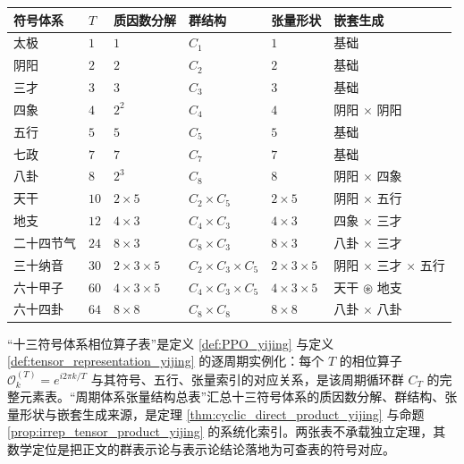 \begin{center}
\begin{tabular}{>{\centering\arraybackslash}p{2.2cm}>{\centering\arraybackslash}p{1cm}>{\centering\arraybackslash}p{2.5cm}>{\centering\arraybackslash}p{3cm}>{\centering\arraybackslash}p{2cm}>{\centering\arraybackslash}p{2.5cm}}
\toprule
符号体系 & $T$ & 质因数分解 & 群结构 & 张量形状 & 嵌套生成 \\
\midrule
太极 & $1$ & $1$ & $C_1$ & $1$ & 基础 \\
阴阳 & $2$ & $2$ & $C_2$ & $2$ & 基础 \\
三才 & $3$ & $3$ & $C_3$ & $3$ & 基础 \\
四象 & $4$ & $2^2$ & $C_4$ & $4$ & 阴阳 $\times$ 阴阳 \\
五行 & $5$ & $5$ & $C_5$ & $5$ & 基础 \\
七政 & $7$ & $7$ & $C_7$ & $7$ & 基础 \\
八卦 & $8$ & $2^3$ & $C_8$ & $8$ & 阴阳 $\times$ 四象 \\
天干 & $10$ & $2 \times 5$ & $C_2 \times C_5$ & $2 \times 5$ & 阴阳 $\times$ 五行 \\
地支 & $12$ & $4 \times 3$ & $C_4 \times C_3$ & $4 \times 3$ & 四象 $\times$ 三才 \\
二十四节气 & $24$ & $8 \times 3$ & $C_8 \times C_3$ & $8 \times 3$ & 八卦 $\times$ 三才 \\
三十纳音 & $30$ & $2 \times 3 \times 5$ & $C_2 \times C_3 \times C_5$ & $2 \times 3 \times 5$ & 阴阳 $\times$ 三才 $\times$ 五行 \\
六十甲子 & $60$ & $4 \times 3 \times 5$ & $C_4 \times C_3 \times C_5$ & $4 \times 3 \times 5$ & 天干 $\circledast$ 地支 \\
六十四卦 & $64$ & $8 \times 8$ & $C_8 \times C_8$ & $8 \times 8$ & 八卦 $\times$ 八卦 \\
\bottomrule
\end{tabular}
\end{center}

\begin{remark}[两大表格的数学定位]
“十三符号体系相位算子表”是定义 \ref{def:PPO_yijing} 与定义 \ref{def:tensor_representation_yijing} 的逐周期实例化：每个 $T$ 的相位算子 $\mathcal{O}_k^{(T)} = e^{i2\pi k/T}$ 与其符号、五行、张量索引的对应关系，是该周期循环群 $C_T$ 的完整元素表。“周期体系张量结构总表”汇总十三符号体系的质因数分解、群结构、张量形状与嵌套生成来源，是定理 \ref{thm:cyclic_direct_product_yijing} 与命题 \ref{prop:irrep_tensor_product_yijing} 的系统化索引。两张表不承载独立定理，其数学定位是把正文的群表示论与表示论结论落地为可查表的符号对应。
\end{remark}

